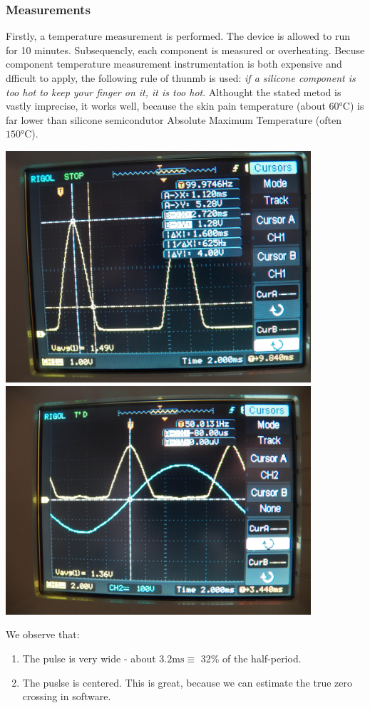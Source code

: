 \subsubsection{Measurements}
Firstly, a temperature measurement is performed.
The device is allowed to run for 10 minutes.
Subsequencly, each component is measured or overheating.
Becuse component temperature measurement instrumentation is both expensive and dfficult to apply, the following rule of thunmb is used:
\textit{if a silicone component is too hot to keep your finger on it, it is too hot}.
Althought the stated metod is vastly imprecise, it works well, because the skin pain temperature (about $60\si{\celsius}$) is far lower than silicone semicondutor Absolute Maximum Temperature (often $150\si{\celsius}$).
\par
\includegraphics[width=0.85\textwidth]{../images/ZCD_scope1}~
\\
\includegraphics[width=0.85\textwidth]{../images/ZCD_scope2}~
\par
We observe that:
\begin{enumerate}
\item{The pulse is very wide - about $3.2\si{\milli\second} \equiv$ 32\% of the half-period.}
\item{The puslse is centered. This is great, because we can estimate the true zero crossing in software.}
\end{enumerate}


